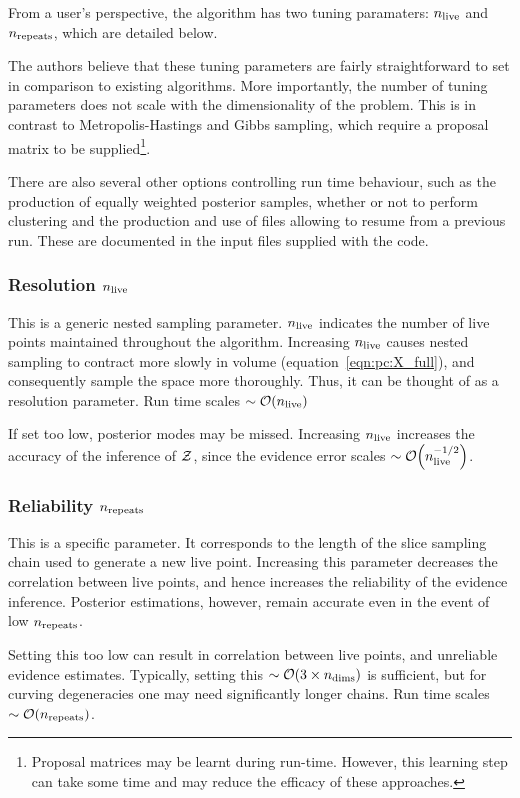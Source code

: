 From a user's perspective, the \PolyChord{} algorithm has two tuning paramaters: \(n_{\mathrm{live}}\) and \(n_{\mathrm{repeats}}\), which are detailed below.

The authors believe that these tuning parameters are fairly straightforward to set in comparison to existing algorithms. More importantly, the number of tuning parameters does not scale with the dimensionality of the problem. This is in contrast to Metropolis-Hastings and Gibbs sampling, which require a proposal matrix to be supplied\footnote{Proposal matrices may be learnt during run-time. However, this learning step can take some time and may reduce the efficacy of these approaches.}.

There are also several other options controlling run time behaviour, such as the production of equally weighted posterior samples, whether or not to perform clustering and the production and use of files allowing \PolyChord{} to resume from a previous run. These are documented in the input files supplied with the code.

\subsubsection*{Resolution \(n_{\mathrm{live}}\) }
This is a generic nested sampling parameter. \(n_{\mathrm{live}}\) indicates the number of live points maintained throughout the algorithm. Increasing \(n_{\mathrm{live}}\) causes nested sampling to contract more slowly in volume (equation~\ref{eqn:pc:X_full}), and consequently sample the space more thoroughly. Thus, it can be thought of as a resolution parameter. Run time scales \({\sim\mathcal{O}{\left(n_{\mathrm{live}}\right)}}\)

If set too low, posterior modes may be missed. Increasing \(n_{\mathrm{live}}\) increases the accuracy of the inference of \(\mathcal{Z}\), since the evidence error scales \({\sim\mathcal{O}{\left(n_{\mathrm{live}}^{-1/2}\right)}}\). 

\subsubsection*{Reliability \(n_{\mathrm{repeats}}\)}
This is a \PolyChord{} specific parameter. It corresponds to the length of the slice sampling chain used to generate a new live point. Increasing this parameter decreases the correlation between live points, and hence increases the reliability of the evidence inference. Posterior estimations, however, remain accurate even in the event of low \(n_{\mathrm{repeats}}\).

Setting this too low can result in correlation between live points, and unreliable evidence estimates. Typically, setting this \({\sim\mathcal{O}{\left(3\times n_{\mathrm{dims}}\right)}}\) is sufficient, but for curving degeneracies one may need significantly longer chains. Run time scales \({\sim\mathcal{O}{\left(n_{\mathrm{repeats}}\right)}}\). 

